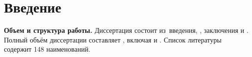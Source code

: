 \chapter*{Введение}                         %

\newcommand{\actuality}{}
\newcommand{\progress}{\textbf{\progressTXT}}
\newcommand{\objectresearch}{\textbf{\objectresearchTXT}}
\newcommand{\subjectresearch}{\textbf{\subjectresearchTXT}}
\newcommand{\aim}{\textbf{\aimTXT}}
\newcommand{\tasks}{\textbf{\tasksTXT}}
\newcommand{\novelty}{\textbf{\noveltyTXT}}
\newcommand{\fieldresearch}{\textbf{\fieldresearchTXT}}
\newcommand{\influence}{\textbf{\influenceTXT}}
\newcommand{\elaboration}{\textbf{\elaborationTXT}}
\newcommand{\methods}{\textbf{\methodsTXT}}
\newcommand{\defpositions}{\textbf{\defpositionsTXT}}

\newcommand{\reliability}{\textbf{\reliabilityTXT}}
\newcommand{\probation}{\textbf{\probationTXT}}
\newcommand{\contribution}{\textbf{\contributionTXT}}
\newcommand{\publications}{\textbf{\publicationsTXT}}


\textbf{Объем и структура работы.} Диссертация состоит из~введения,
,
заключения и
.
%
Полный объём диссертации составляет
, включая
 и
.
Список литературы содержит 148 наименований.
